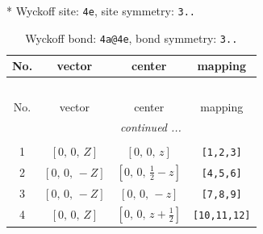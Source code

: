 \documentclass[fleqn,8pt]{jsarticle}
\begin{document}
* Wyckoff site: {\tt 4e}, site symmetry: {\tt 3..}
\renewcommand{\arraystretch}{1.2}
\begin{longtable}{cccc}
\caption{Wyckoff bond: {\tt 4a@4e}, bond symmetry: {\tt 3..}}
 \\
 \hline \hline
No. & vector & center & mapping \\ \hline \endfirsthead

\multicolumn{3}{l}{\tablename\ \thetable{}} \\
 \hline \hline
No. & vector & center & mapping \\ \hline \endhead

 \hline \hline
\multicolumn{3}{r}{\footnotesize\it continued ...} \\ \endfoot

 \hline \hline
\multicolumn{3}{r}{} \\ \endlastfoot

1 & $\left[ 0,\, 0,\, Z \right]$ & $\left[ 0,\, 0,\, z \right]$ & {\tt [1,2,3]} \\ \hline
2 & $\left[ 0,\, 0,\, - Z \right]$ & $\left[ 0,\, 0,\, \frac{1}{2} - z \right]$ & {\tt [4,5,6]} \\ \hline
3 & $\left[ 0,\, 0,\, - Z \right]$ & $\left[ 0,\, 0,\, - z \right]$ & {\tt [7,8,9]} \\ \hline
4 & $\left[ 0,\, 0,\, Z \right]$ & $\left[ 0,\, 0,\, z + \frac{1}{2} \right]$ & {\tt [10,11,12]} \\
\end{longtable}
\renewcommand{\arraystretch}{1.2}
\end{document}
